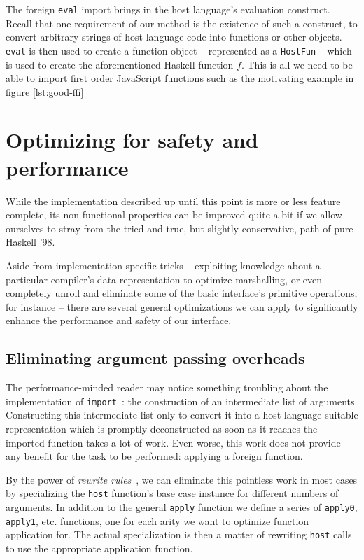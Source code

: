 \documentclass[preprint]{sigplanconf}
\begin{document}
The foreign \lstinline!eval! import brings in the host language's evaluation
construct. Recall that one requirement of our method is the existence of such
a construct, to convert arbitrary strings of host language code into functions
or other objects. \lstinline!eval! is then used to create a function object --
represented as a \lstinline!HostFun! -- which is used to create the
aforementioned Haskell function $f$.
This is all we need to be able to import first order JavaScript functions
such as the motivating example in figure \ref{lst:good-ffi}

\section{Optimizing for safety and performance}
\label{sec:optimizations}
While the implementation described up until this point is more or less
feature complete, its non-functional properties can be improved quite a bit
if we allow ourselves to stray from the tried and true, but slightly
conservative, path of pure Haskell '98.

Aside from implementation specific tricks -- exploiting knowledge about a
particular compiler's data representation to optimize marshalling, or even
completely unroll and eliminate some of the basic interface's primitive
operations, for instance -- there are several general optimizations we can
apply to significantly enhance the performance and safety of our interface.

\subsection{Eliminating argument passing overheads}
\label{sec:specialization}
The performance-minded reader may notice something troubling about the
implementation of \lstinline!import_!: the construction of an intermediate list
of arguments. Constructing this intermediate list only to convert it into a
host language suitable representation which is promptly deconstructed as soon
as it reaches the imported function takes a lot of work. Even worse, this work
does not provide any benefit for the task to be performed: applying a foreign
function.

By the power of \emph{rewrite rules}\ \cite{rewriterules}, we can
eliminate this pointless work in most cases by specializing the
\lstinline!host! function's base case instance for different numbers of
arguments.
In addition to the general \lstinline!apply! function we define a series of
\lstinline!apply0!, \lstinline!apply1!, etc. functions, one for each arity
we want to optimize function application for.
The actual specialization is then a matter of
rewriting \lstinline!host! calls to use the appropriate application function.
\end{document}
